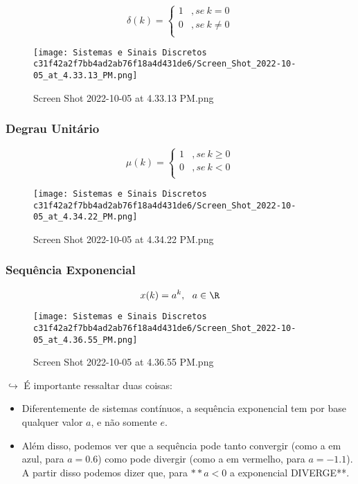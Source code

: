\documentclass{article}
\begin{document}
\begin{itemize}
\[
\delta (k) = \begin{cases}
1 & ,se \ k =0 \\ 
0 & ,se \ k \ne0 \\ 
\end{cases}
\]

\begin{figure}
\centering
\texttt{[image: Sistemas e Sinais Discretos c31f42a2f7bb4ad2ab76f18a4d431de6/Screen\_Shot\_2022-10-05\_at\_4.33.13\_PM.png]}
\caption{Screen Shot 2022-10-05 at 4.33.13 PM.png}
\end{figure}

\hypertarget{degrau-unituxe1rio}{%
\subsubsection{Degrau Unitário}\label{degrau-unituxe1rio}}

\[
\mu (k) = \begin{cases}
1 & ,se \ k \ge0 \\ 
0 & ,se \ k <0 \\ 
\end{cases}
\]

\begin{figure}
\centering
\texttt{[image: Sistemas e Sinais Discretos c31f42a2f7bb4ad2ab76f18a4d431de6/Screen\_Shot\_2022-10-05\_at\_4.34.22\_PM.png]}
\caption{Screen Shot 2022-10-05 at 4.34.22 PM.png}
\end{figure}

\hypertarget{sequuxeancia-exponencial}{%
\subsubsection{Sequência Exponencial}\label{sequuxeancia-exponencial}}

\[
x(k) = a^k,  \ \ a\in \R
\]

\begin{figure}
\centering
\texttt{[image: Sistemas e Sinais Discretos c31f42a2f7bb4ad2ab76f18a4d431de6/Screen\_Shot\_2022-10-05\_at\_4.36.55\_PM.png]}
\caption{Screen Shot 2022-10-05 at 4.36.55 PM.png}
\end{figure}

\(\hookrightarrow\) É importante ressaltar duas coisas:

\begin{itemize}
\tightlist
\item
  Diferentemente de sistemas contínuos, a sequência exponencial tem por
  base qualquer valor \(a\), e não somente \(e\).
\item
  Além disso, podemos ver que a sequência pode tanto convergir (como a
  em azul, para \(a = 0.6\)) como pode divergir (como a em vermelho,
  para \(a = -1.1\)). A partir disso podemos dizer que, para \(**a<0\) a
  exponencial DIVERGE**.
\end{itemize}


\end{itemize}
\end{document}
